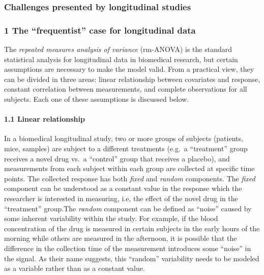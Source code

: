 \documentclass[
]{article}
\begin{document}
\hypertarget{challenges-presented-by-longitudinal-studies}{%
\subsubsection{Challenges presented by longitudinal
studies}\label{challenges-presented-by-longitudinal-studies}}

\hypertarget{the-frequentist-case-for-longitudinal-data}{%
\subsubsection{1 The ``frequentist'' case for longitudinal
data}\label{the-frequentist-case-for-longitudinal-data}}

The \emph{repeated measures analysis of variance} (rm-ANOVA) is the
standard statistical analysis for longitudinal data in biomedical
research, but certain assumptions are necessary to make the model valid.
From a practical view, they can be divided in three areas: linear
relationship between covariates and response, constant correlation
between measurements, and complete observations for all subjects. Each
one of these assumptions is discussed below.

\hypertarget{linear-relationship}{%
\paragraph{1.1 Linear relationship}\label{linear-relationship}}

In a biomedical longitudinal study, two or more groups of subjects
(patients, mice, samples) are subject to a different treatments (e.g.~a
``treatment'' group receives a novel drug vs.~a ``control'' group that
receives a placebo), and measurements from each subject within each
group are collected at specific time points. The collected response has
both \emph{fixed} and \emph{random} components. The \emph{fixed}
component can be understood as a constant value in the response which
the researcher is interested in measuring, i.e, the effect of the novel
drug in the ``treatment'' group.The \emph{random} component can be
defined as ``noise'' caused by some inherent variability within the
study. For example, if the blood concentration of the drug is measured
in certain subjects in the early hours of the morning while others are
measured in the afternoon, it is possible that the difference in the
collection time of the measurement introduces some ``noise'' in the
signal. As their name suggests, this ``random'' variability needs to be
modeled as a variable rather than as a constant value.
\end{document}
